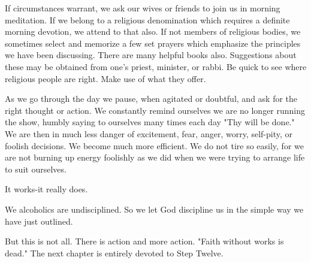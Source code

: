 \begin{biblechapter}
If circumstances warrant, we ask our wives or friends to join us in morning meditation.  If we belong to a religious denomination which requires a definite morning devotion, we attend to that also.  If not members of religious bodies, we sometimes select and memorize a few set prayers which emphasize the principles we have been discussing.  There are many helpful books also.  Suggestions about these may be obtained from one's priest, minister, or rabbi.  Be quick to see where religious people are right.  Make use of what they offer.

As we go through the day we pause, when agitated or doubtful, and ask for the right thought or action.  We constantly remind ourselves we are no longer running the show, humbly saying to ourselves many times each day "Thy will be done."  We are then in much less danger of excitement, fear, anger, worry, self-pity, or foolish decisions.  We become much more efficient.  We do not tire so easily, for we are not burning up energy foolishly as we did when we were trying to arrange life to suit ourselves.

It works-it really does.

We alcoholics are undisciplined.  So we let God discipline us in the simple way we have just outlined.

But this is not all.  There is action and more action.  "Faith without works is dead."  The next chapter is entirely devoted to Step Twelve.

\end{biblechapter}


